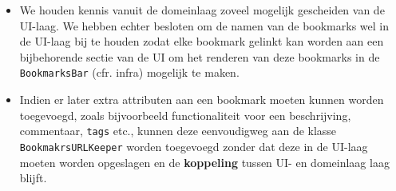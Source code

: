 \documentclass[12pt]{article}
\begin{document}
\begin{itemize}
	\item We houden kennis vanuit de domeinlaag zoveel mogelijk gescheiden van de UI-laag. We hebben echter besloten om de namen van de bookmarks wel in de UI-laag bij te houden zodat elke bookmark gelinkt kan worden aan een bijbehorende sectie van de UI om het renderen van deze bookmarks in de \texttt{BookmarksBar} (cfr. infra) mogelijk te maken.
	\item Indien er later extra attributen aan een bookmark moeten kunnen worden toegevoegd, zoals bijvoorbeeld functionaliteit voor een beschrijving, commentaar, \texttt{tags} etc., kunnen deze eenvoudigweg aan de klasse \texttt{BookmakrsURLKeeper} worden toegevoegd zonder dat deze in de UI-laag moeten worden opgeslagen en de \textbf{koppeling} tussen UI- en domeinlaag laag blijft.
\end{itemize}
\end{document}
